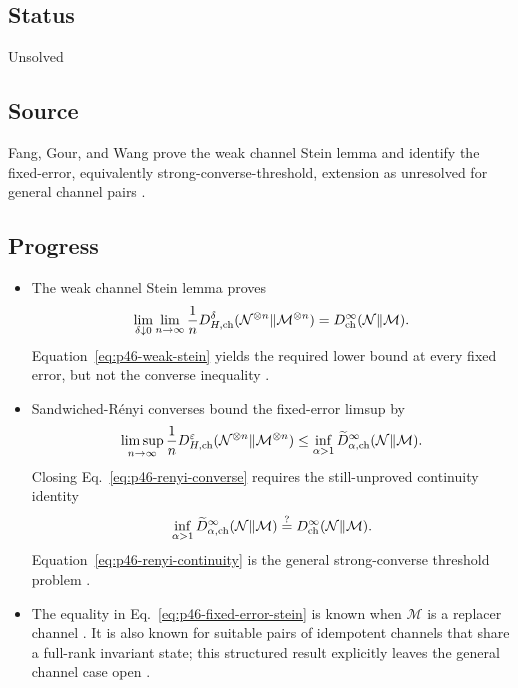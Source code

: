\subsection*{Status}

Unsolved

\subsection*{Source}

Fang, Gour, and Wang prove the weak channel Stein lemma and identify the
fixed-error, equivalently strong-converse-threshold, extension as unresolved
for general channel pairs .

\subsection*{Progress}

\begin{itemize}
  \item The weak channel Stein lemma proves
  \begin{equation}
    \lim_{\delta\downarrow0}\lim_{n\to\infty}\frac1n
    D_{H,{\rm ch}}^\delta
    (\mathcal N^{\otimes n}\|\mathcal M^{\otimes n})
    =D_{\rm ch}^{\infty}(\mathcal N\|\mathcal M).
    \label{eq:p46-weak-stein}
  \end{equation}
  Equation~\eqref{eq:p46-weak-stein} yields the required lower bound at
  every fixed error, but not the converse inequality
  .

  \item Sandwiched-R\'enyi converses bound the fixed-error limsup by
  \begin{equation}
    \limsup_{n\to\infty}\frac1nD_{H,{\rm ch}}^\varepsilon
    (\mathcal N^{\otimes n}\|\mathcal M^{\otimes n})
    \leq\inf_{\alpha>1}
    \widetilde D_{\alpha,{\rm ch}}^\infty(\mathcal N\|\mathcal M).
    \label{eq:p46-renyi-converse}
  \end{equation}
  Closing Eq.~\eqref{eq:p46-renyi-converse} requires the still-unproved
  continuity identity
  \begin{equation}
    \inf_{\alpha>1}\widetilde D_{\alpha,{\rm ch}}^\infty
       (\mathcal N\|\mathcal M)
    \stackrel{?}{=}D_{\rm ch}^\infty(\mathcal N\|\mathcal M).
    \label{eq:p46-renyi-continuity}
  \end{equation}
  Equation~\eqref{eq:p46-renyi-continuity} is the general strong-converse
  threshold problem .

  \item The equality in Eq.~\eqref{eq:p46-fixed-error-stein} is known when
  $\mathcal M$ is a replacer channel
  .  It is also known for
  suitable pairs of idempotent channels that share a full-rank invariant
  state; this structured result explicitly leaves the general channel case
  open .
\end{itemize}

